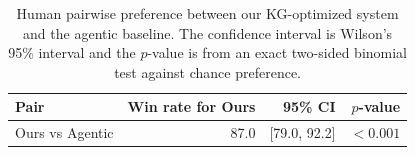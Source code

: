 \begin{table}[t]
\centering
\small
\begin{tabular}{lrrr}
\toprule
Pair & Win rate for Ours & 95\% CI & $p$-value \\
\midrule
Ours vs Agentic & 87.0 & [79.0, 92.2] & $<0.001$ \\
\bottomrule
\end{tabular}
\caption{Human pairwise preference between our KG-optimized system and the agentic baseline. The confidence interval is Wilson's 95\% interval and the $p$-value is from an exact two-sided binomial test against chance preference.}
\label{tab:human_pairwise_generated}
\end{table}
